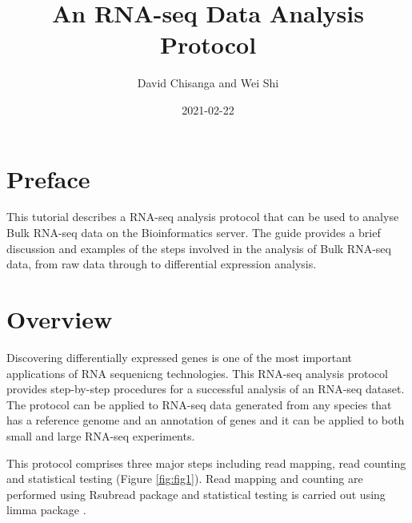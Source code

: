 \documentclass[]{book}
\title{An RNA-seq Data Analysis Protocol}
\author{David Chisanga and Wei Shi}
\date{2021-02-22}
\begin{document}
\maketitle

{
\setcounter{tocdepth}{1}
\tableofcontents
}
\hypertarget{preface}{%
\chapter*{Preface}\label{preface}}

This tutorial describes a RNA-seq analysis protocol that can be used to analyse Bulk RNA-seq data on the Bioinformatics server. The guide provides a brief discussion and examples of the steps involved in the analysis of Bulk RNA-seq data, from raw data through to differential expression analysis.

\hypertarget{intro}{%
\chapter{Overview}\label{intro}}

Discovering differentially expressed genes is one of the most important applications of RNA sequenicng technologies. This RNA-seq analysis protocol provides step-by-step procedures for a successful analysis of an RNA-seq dataset. The protocol can be applied to RNA-seq data generated
from any species that has a reference genome and an annotation of genes and it can be applied to both small and large RNA-seq experiments.

This protocol comprises three major steps including read mapping, read counting and statistical testing (Figure \ref{fig:fig1}). Read mapping and counting are performed using Rsubread package \citep{Rsubread2019} and statistical testing is carried out using limma package \citep{limma2015}.
\end{document}
